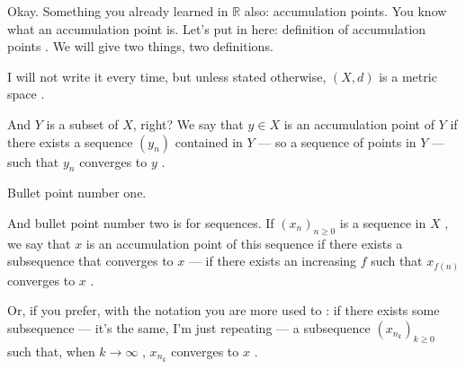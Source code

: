 \begin{speech}[00:22:37 - 00:24:12]
Okay. Something you already learned in $\mathbb{R}$ also: accumulation points. You know what an accumulation point is. Let's put in here: definition of accumulation points . We will give two things, two definitions.

I will not write it every time, but unless stated otherwise, $(X, d)$ is a metric space .

And $Y$ is a subset of $X$, right?  We say that $y \in X$  is an accumulation point  of $Y$  if there exists a sequence $(y_n)$ contained in $Y$  --- so a sequence of points in $Y$ --- such that $y_n$ converges to $y$ .

Bullet point number one.
\end{speech}

\begin{speech}[00:24:12 - 00:26:03]
And bullet point number two  is for sequences. If $(x_n)_{n \ge 0}$ is a sequence in $X$ , we say that $x$ is an accumulation point  of this sequence if there exists a subsequence that converges to $x$ --- if there exists an increasing $f$  such that $x_{f(n)}$ converges to $x$ .

Or, if you prefer, with the notation you are more used to : if there exists some subsequence  --- it's the same, I'm just repeating --- a subsequence $(x_{n_k})_{k \ge 0}$ such that, when $k \to \infty$ , $x_{n_k}$ converges to $x$ .
\end{speech}

